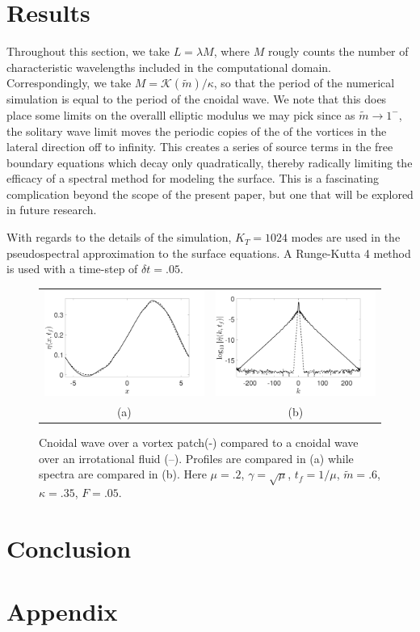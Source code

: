 \documentclass[a4paper,11pt]{article}
\begin{document}
\section*{Results}
Throughout this section, we take $L = \lambda M$, where $M$ rougly counts the number of characteristic wavelengths included in the computational domain.   Correspondingly, we take $M=\mathcal{K}(\tilde{m})/\kappa$, so that the period of the numerical simulation is equal to the period of the cnoidal wave.   We note that this does place some limits on the overalll elliptic modulus we may pick since as $\tilde{m}\rightarrow 1^{-}$, the solitary wave limit moves the periodic copies of the of the vortices in the lateral direction off to infinity.  This creates a series of source terms in the free boundary equations which decay only quadratically, thereby radically limiting the efficacy of a spectral method for modeling the surface.  This is a fascinating complication beyond the scope of the present paper, but one that will be explored in future research.  

With regards to the details of the simulation, $K_{T} = 1024$ modes are used in the pseudospectral approximation to the surface equations.  A Runge-Kutta 4 method is used with a time-step of $\delta t = .05$.    
\begin{figure}
\centering
\begin{tabular}{cc}
\includegraphics[width=.45\textwidth]{profiles} &  \includegraphics[width=.45\textwidth]{spectrum}\\
(a) & (b)
\end{tabular}
\caption{Cnoidal wave over a vortex patch(-) compared to a cnoidal wave over an irrotational fluid (--).  Profiles are compared in (a) while spectra are compared in (b).  Here $\mu=.2$, $\gamma=\sqrt{\mu}$, $t_{f}=1/\mu$, $\tilde{m}=.6$, $\kappa = .35$, $F=.05$.}
\end{figure}

\section*{Conclusion}
\section*{Appendix}


\end{document}
